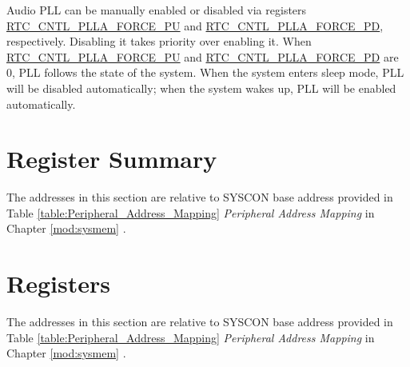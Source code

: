 \documentclass[main\_\_EN.tex]{subfiles}
\begin{document}
Audio PLL can be manually enabled or disabled via registers \hyperref[fielddesc:RTCCNTLPLLAFORCEPU]{RTC\_CNTL\_PLLA\_FORCE\_PU} and \hyperref[fielddesc:RTCCNTLPLLAFORCEPD]{RTC\_CNTL\_PLLA\_FORCE\_PD}, respectively. Disabling it takes priority over enabling it. When \hyperref[fielddesc:RTCCNTLPLLAFORCEPU]{RTC\_CNTL\_PLLA\_FORCE\_PU} and \hyperref[fielddesc:RTCCNTLPLLAFORCEPD]{RTC\_CNTL\_PLLA\_FORCE\_PD} are 0, PLL follows the state of the system. When the system enters sleep mode, PLL will be disabled automatically; when the system wakes up, PLL will be enabled automatically.

\section{Register Summary}\label{sec:resclk-reg-summ}

The addresses in this section are relative to SYSCON base address provided in Table \ref{table:Peripheral_Address_Mapping} \textit{Peripheral Address Mapping} in Chapter \ref{mod:sysmem} \textit{}.



\section{Registers}

The addresses in this section are relative to SYSCON base address provided in Table \ref{table:Peripheral_Address_Mapping} \textit{Peripheral Address Mapping} in Chapter \ref{mod:sysmem} \textit{}.


\end{document}
